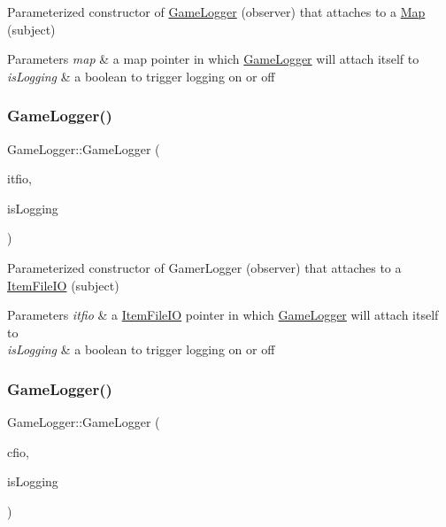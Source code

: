 Parameterized constructor of \hyperlink{class_game_logger}{Game\+Logger} (observer) that attaches to a \hyperlink{class_map}{Map} (subject) 
\begin{DoxyParams}{Parameters}
{\em map} & a map pointer in which \hyperlink{class_game_logger}{Game\+Logger} will attach itself to \\
\hline
{\em is\+Logging} & a boolean to trigger logging on or off \\
\hline
\end{DoxyParams}
\hypertarget{class_game_logger_a719786a929f2eae0b1f948a71f427386}{}\label{class_game_logger_a719786a929f2eae0b1f948a71f427386} 
\subsubsection{\texorpdfstring{Game\+Logger()}{GameLogger()}\hspace{0.1cm}{\footnotesize\ttfamily [3/7]}}
{\footnotesize\ttfamily Game\+Logger\+::\+Game\+Logger (\begin{DoxyParamCaption}\item[{\hyperlink{class_item_file_i_o}{Item\+File\+IO} $\ast$}]{itfio,  }\item[{bool}]{is\+Logging }\end{DoxyParamCaption})}

Parameterized constructor of Gamer\+Logger (observer) that attaches to a \hyperlink{class_item_file_i_o}{Item\+File\+IO} (subject) 
\begin{DoxyParams}{Parameters}
{\em itfio} & a \hyperlink{class_item_file_i_o}{Item\+File\+IO} pointer in which \hyperlink{class_game_logger}{Game\+Logger} will attach itself to \\
\hline
{\em is\+Logging} & a boolean to trigger logging on or off \\
\hline
\end{DoxyParams}
\hypertarget{class_game_logger_a88b7807f40894cf85e927ccf438da485}{}\label{class_game_logger_a88b7807f40894cf85e927ccf438da485} 
\subsubsection{\texorpdfstring{Game\+Logger()}{GameLogger()}\hspace{0.1cm}{\footnotesize\ttfamily [4/7]}}
{\footnotesize\ttfamily Game\+Logger\+::\+Game\+Logger (\begin{DoxyParamCaption}\item[{\hyperlink{class_character_file_i_o}{Character\+File\+IO} $\ast$}]{cfio,  }\item[{bool}]{is\+Logging }\end{DoxyParamCaption})}

